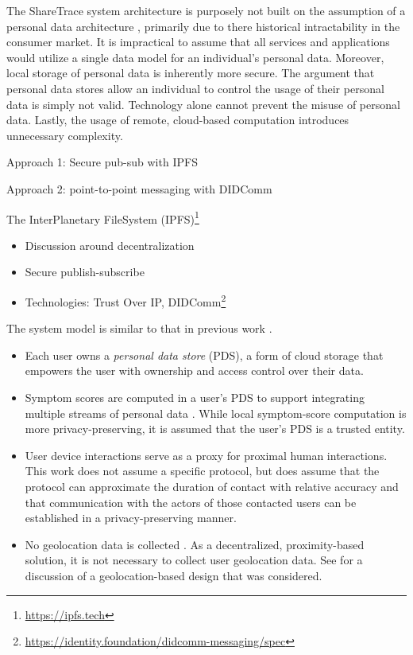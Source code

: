The ShareTrace system architecture is purposely not built on the assumption of a personal data architecture \citep{Narayanan2012}, primarily due to there historical intractability in the consumer market. It is impractical to assume that all services and applications would utilize a single data model for an individual's personal data. Moreover, local storage of personal data is inherently more secure. The argument that personal data stores allow an individual to control the usage of their personal data is simply not valid. Technology alone cannot prevent the misuse of personal data. Lastly, the usage of remote, cloud-based computation introduces unnecessary complexity.

Approach 1: Secure pub-sub with IPFS

Approach 2: point-to-point messaging with DIDComm

The InterPlanetary FileSystem (IPFS)\footnote{\url{https://ipfs.tech}} \citep{Benet2014, Trautwein2022}

\begin{itemize}
  \item Discussion around decentralization \citep{Troncoso2017}
  \item Secure publish-subscribe
  \item Technologies: Trust Over IP, DIDComm\footnote{\url{https://identity.foundation/didcomm-messaging/spec}}
\end{itemize}

The system model is similar to that in previous work \citep{Ayday2020, Ayday2021}.
\begin{itemize}
  \item Each user owns a \emph{personal data store} (PDS), a form of cloud storage that empowers the user with ownership and access control over their data.
  \item Symptom scores are computed in a user's PDS to support integrating multiple streams of personal data \citep{Ayday2020}. While local symptom-score computation \citep{Ayday2020, Ayday2021} is more privacy-preserving, it is assumed that the user's PDS is a trusted entity.
  \item User device interactions serve as a proxy for proximal human interactions. This work does not assume a specific protocol, but does assume that the protocol can approximate the duration of contact with relative accuracy and that communication with the actors of those contacted users can be established in a privacy-preserving manner.
  \item No geolocation data is collected \citep{Ayday2020}. As a decentralized, proximity-based solution, it is not necessary to collect user geolocation data. See  for a discussion of a geolocation-based design that was considered.
\end{itemize}

